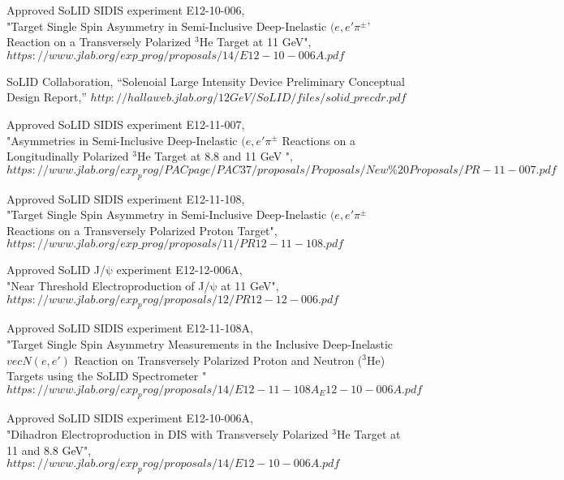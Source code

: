 \begin{thebibliography}{}
  Approved SoLID SIDIS experiment E12-10-006,\\
  "Target Single Spin Asymmetry in Semi-Inclusive Deep-Inelastic $(e,e'\pi^{\pm}$' Reaction on a Transversely Polarized $\mathrm{^{3}He}$ Target at 11 GeV",\\
$https://www.jlab.org/exp\_prog/proposals/14/E12-10-006A.pdf$


  SoLID Collaboration, ``Solenoial Large Intensity Device Preliminary Conceptual Design Report,''
  $http://hallaweb.jlab.org/12GeV/SoLID/files/solid\_precdr.pdf$

  Approved SoLID SIDIS experiment E12-11-007,\\
"Asymmetries in Semi-Inclusive Deep-Inelastic  $(e,e'\pi^{\pm}$ Reactions on a Longitudinally Polarized $\mathrm{^{3}He}$ Target at 8.8 and 11 GeV ",\\
$https://www.jlab.org/exp_prog/PACpage/PAC37/proposals/Proposals/New\%20Proposals/PR-11-007.pdf$

  Approved SoLID SIDIS experiment E12-11-108,\\
"Target Single Spin Asymmetry in Semi-Inclusive Deep-Inelastic $(e,e'\pi^{\pm}$ Reactions on a Transversely Polarized Proton Target",\\
$https://www.jlab.org/exp\_prog/proposals/11/PR12-11-108.pdf$

  Approved SoLID J/$\mathrm{\psi}$ experiment E12-12-006A,\\
  "Near Threshold Electroproduction of J/$\mathrm{\psi}$ at 11 GeV",\\
$https://www.jlab.org/exp_prog/proposals/12/PR12-12-006.pdf$

   Approved SoLID SIDIS experiment E12-11-108A,\\
"Target Single Spin Asymmetry Measurements in the Inclusive Deep-Inelastic $vec{N}(e,e')$ Reaction on Transversely Polarized Proton and Neutron ($\mathrm{^{3}He}$) Targets using the SoLID Spectrometer "\\
$https://www.jlab.org/exp_prog/proposals/14/E12-11-108A_E12-10-006A.pdf$

  Approved SoLID SIDIS experiment E12-10-006A,\\
  "Dihadron Electroproduction in DIS with  Transversely Polarized $\mathrm{^{3}He}$ Target at 11 and 8.8 GeV",\\
$https://www.jlab.org/exp_prog/proposals/14/E12-10-006A.pdf$


\end{thebibliography}
